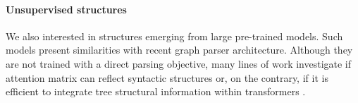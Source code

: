 




\paragraph{Unsupervised structures} We  also interested in structures emerging from large pre-trained models. Such models present similarities with recent graph parser architecture. Although they are not trained with a direct parsing objective, many lines of work investigate if attention matrix can reflect syntactic structures \parencite{jawahar_19, clark_19, ravishankar_21} or, on the contrary, if it is efficient to integrate tree structural information within transformers \parencite{wang_19, bai_21}. 

